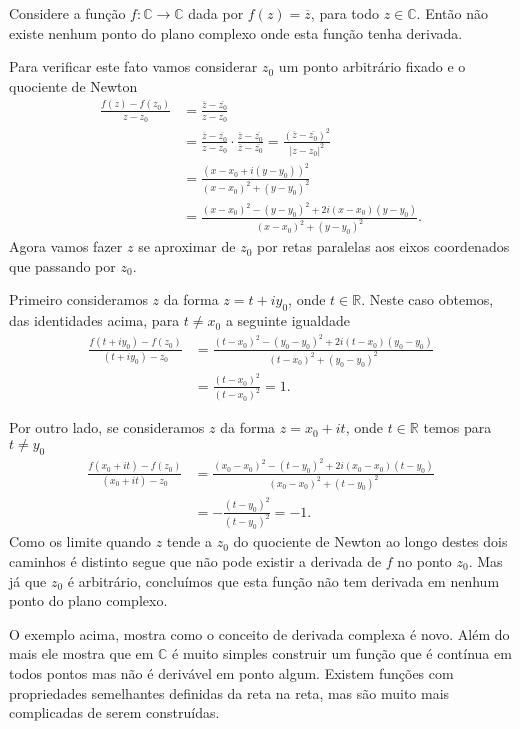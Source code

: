 \begin{exemplo}
Considere a função $f:\mathbb{C}\to\mathbb{C}$ dada por $f(z)=\overline{z}$, para todo $z\in\mathbb{C}$.
Então não existe nenhum ponto do plano complexo onde esta função tenha derivada.

Para verificar este fato vamos considerar $z_0$ um ponto arbitrário fixado e o quociente de Newton 
\begin{align*}
\frac{f(z)-f(z_0)}{z-z_0}
&=
\frac{\overline{z}-\overline{z_0}}{z-z_0}
\\
&=
\frac{\overline{z}-\overline{z_0}}{z-z_0} \cdot \frac{\overline{z}-\overline{z_0}}{\overline{z}-\overline{z_0}}
=
\frac{(\overline{z}-\overline{z_0})^2}{|z-z_0|^2} 
\\
&=
\frac{(x-x_0+i(y-y_0))^2}{(x-x_0)^2+(y-y_0)^2}
\\
&=
\frac{(x-x_0)^2-(y-y_0)^2+2i(x-x_0)(y-y_0)}{(x-x_0)^2+(y-y_0)^2}.
\end{align*}
Agora vamos fazer $z$ se aproximar de $z_0$ por retas paralelas aos eixos coordenados que passando por 
$z_0$.

Primeiro consideramos  $z$ da forma $z=t+iy_0$, onde $t\in\mathbb{R}$. Neste caso obtemos, das identidades acima,
para $t\neq x_0$ a seguinte igualdade
\begin{align*}
\frac{f(t+iy_0)-f(z_0)}{(t+iy_0)-z_0}
&=
\frac{(t-x_0)^2-(y_0-y_0)^2+2i(t-x_0)(y_0-y_0)}{(t-x_0)^2+(y_0-y_0)^2}
\\
&=
\frac{(t-x_0)^2}{(t-x_0)^2}=1.
\end{align*}

Por outro lado, se consideramos $z$ da forma $z=x_0+it$, onde $t\in\mathbb{R}$ temos para $t\neq y_0$
\begin{align*}
\frac{f(x_0+it)-f(z_0)}{(x_0+it)-z_0}
&=
\frac{(x_0-x_0)^2-(t-y_0)^2+2i(x_0-x_0)(t-y_0)}{(x_0-x_0)^2+(t-y_0)^2}
\\
&=
-\frac{(t-y_0)^2}{(t-y_0)^2}=-1.
\end{align*}
Como os limite quando $z$ tende a $z_0$ do quociente de Newton ao longo destes dois caminhos é distinto
segue que não pode existir a derivada de $f$ no ponto $z_0$. Mas já que $z_0$ é arbitrário, concluímos que
esta função não tem derivada em nenhum ponto do plano complexo.
\end{exemplo}

O exemplo acima, mostra como o conceito de derivada complexa é novo. Além do mais ele mostra
que em $\mathbb{C}$ é muito simples construir um função que é contínua em todos pontos
mas não é derivável em ponto algum. Existem funções com propriedades semelhantes definidas da reta na reta,
mas são muito mais complicadas de serem construídas. 


